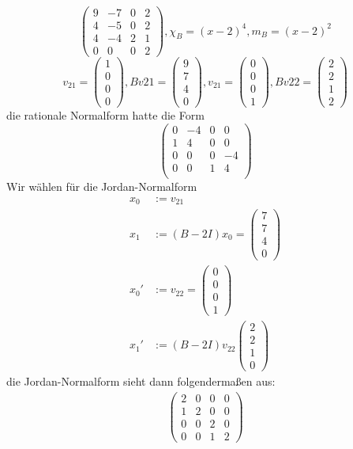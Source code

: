 \documentclass[a4paper, 10pt]{scrbook}
\begin{document}
\begin{ex}
	\[
		\begin{pmatrix}
			9 & -7 & 0 & 2\\
			4 & -5 & 0 & 2\\
			4 & -4 & 2 & 1\\
			0 & 0 & 0 & 2
		\end{pmatrix}, \chi_B = (x-2)^4, m_B = (x-2)^2
	\]
	\[
	v_{21}=\begin{pmatrix}1\\0\\0\\0\end{pmatrix}, Bv{21} = \begin{pmatrix}9\\7\\4\\0\end{pmatrix}, v_{21}=\begin{pmatrix}0\\0\\0\\1\end{pmatrix}, Bv{22} = \begin{pmatrix}2\\2\\1\\2\end{pmatrix}
	\]
	die rationale Normalform hatte die Form
	\[
		\begin{pmatrix}
			0 & -4 & 0 & 0\\
			1 & 4 & 0 & 0\\
			0 & 0 & 0 & -4\\
			0 & 0 & 1 & 4\\
		\end{pmatrix}
	\]
	Wir wählen für die Jordan-Normalform
	\begin{align*}
		x_0 &:= v_{21}\\
	x_1 &:= (B-2I)x_0 = \begin{pmatrix}7\\7\\4\\0\end{pmatrix}\\
	x_0' &:= v_{22} = \begin{pmatrix}0\\0\\0\\1\end{pmatrix}\\
	x_1' &:= (B-2I)v_{22} \begin{pmatrix}2\\2\\1\\0\end{pmatrix}
	\end{align*}
	die Jordan-Normalform sieht dann folgendermaßen aus:
	\begin{align*}
		\begin{pmatrix}2&0&0&0\\1&2&0&0\\0&0&2&0\\0&0&1&2\end{pmatrix}
	\end{align*}
\end{ex}
\end{document}
